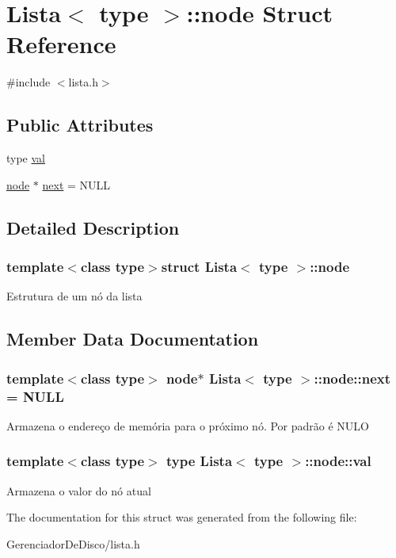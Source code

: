 \hypertarget{structLista_1_1node}{\section{Lista$<$ type $>$\+:\+:node Struct Reference}
\label{structLista_1_1node}
}


{\ttfamily \#include $<$lista.\+h$>$}

\subsection*{Public Attributes}
\begin{DoxyCompactItemize}
\item 
type \hyperlink{structLista_1_1node_a296293814eb82b9a0ff188a8a4c7aedc}{val}
\item 
\hyperlink{structLista_1_1node}{node} $\ast$ \hyperlink{structLista_1_1node_a352a7913205b61620f95559234ebbf40}{next} = N\+U\+L\+L
\end{DoxyCompactItemize}


\subsection{Detailed Description}
\subsubsection*{template$<$class type$>$struct Lista$<$ type $>$\+::node}

Estrutura de um nó da lista 

\subsection{Member Data Documentation}
\hypertarget{structLista_1_1node_a352a7913205b61620f95559234ebbf40}{
\subsubsection[{next}]{\setlength{\rightskip}{0pt plus 5cm}template$<$class type$>$ {\bf node}$\ast$ {\bf Lista}$<$ type $>$\+::node\+::next = N\+U\+L\+L}}\label{structLista_1_1node_a352a7913205b61620f95559234ebbf40}
Armazena o endereço de memória para o próximo nó. Por padrão é N\+U\+L\+O \hypertarget{structLista_1_1node_a296293814eb82b9a0ff188a8a4c7aedc}{
\subsubsection[{val}]{\setlength{\rightskip}{0pt plus 5cm}template$<$class type$>$ type {\bf Lista}$<$ type $>$\+::node\+::val}}\label{structLista_1_1node_a296293814eb82b9a0ff188a8a4c7aedc}
Armazena o valor do nó atual 

The documentation for this struct was generated from the following file\+:\begin{DoxyCompactItemize}
\item 
Gerenciador\+De\+Disco/lista.\+h\end{DoxyCompactItemize}
